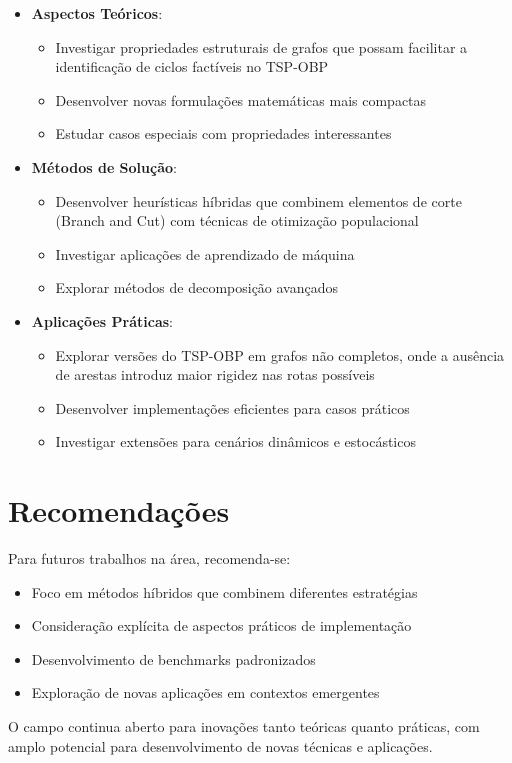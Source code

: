 \documentclass[12pt, a4paper]{report}
\begin{document}
\begin{itemize}
    \item \textbf{Aspectos Teóricos}:
    \begin{itemize}
        \item Investigar propriedades estruturais de grafos que possam facilitar a identificação de ciclos factíveis no TSP-OBP
        \item Desenvolver novas formulações matemáticas mais compactas
        \item Estudar casos especiais com propriedades interessantes
    \end{itemize}
    
    \item \textbf{Métodos de Solução}:
    \begin{itemize}
        \item Desenvolver heurísticas híbridas que combinem elementos de corte (Branch and Cut) com técnicas de otimização populacional
        \item Investigar aplicações de aprendizado de máquina
        \item Explorar métodos de decomposição avançados
    \end{itemize}
    
    \item \textbf{Aplicações Práticas}:
    \begin{itemize}
        \item Explorar versões do TSP-OBP em grafos não completos, onde a ausência de arestas introduz maior rigidez nas rotas possíveis
        \item Desenvolver implementações eficientes para casos práticos
        \item Investigar extensões para cenários dinâmicos e estocásticos
    \end{itemize}
\end{itemize}

\section{Recomendações}

Para futuros trabalhos na área, recomenda-se:

\begin{itemize}
    \item Foco em métodos híbridos que combinem diferentes estratégias
    \item Consideração explícita de aspectos práticos de implementação
    \item Desenvolvimento de benchmarks padronizados
    \item Exploração de novas aplicações em contextos emergentes
\end{itemize}

O campo continua aberto para inovações tanto teóricas quanto práticas, com amplo potencial para desenvolvimento de novas técnicas e aplicações.

\newpage
\renewcommand{\refname}{Referências Bibliográficas}

\nocite{lopesfilho2019, carvalho2022, gomes2016, gomes2018, salvador, machado, ramos, carnielli}
\end{document}
